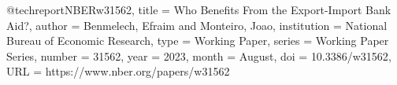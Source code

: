 @techreport{NBERw31562,
  title       = {Who Benefits From the Export-Import Bank Aid?},
  author      = {Benmelech, Efraim and Monteiro, Joao},
  institution = {National Bureau of Economic Research},
  type        = {Working Paper},
  series      = {Working Paper Series},
  number      = {31562},
  year        = {2023},
  month       = {August},
  doi         = {10.3386/w31562},
  URL         = {https://www.nber.org/papers/w31562}
}
